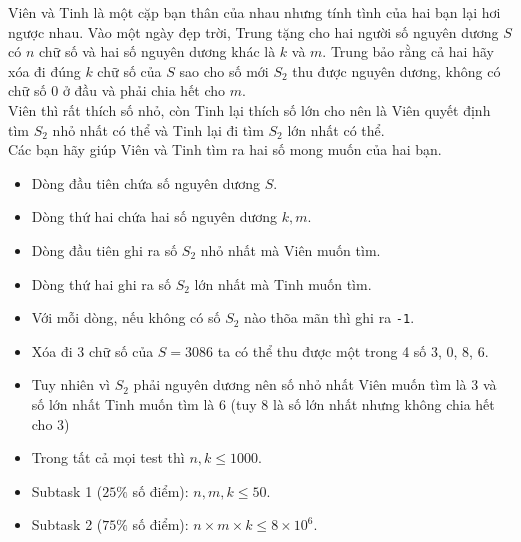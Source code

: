 \documentclass[12pt,a4paper,oneside]{article}
\begin{document}

\renewcommand{\baselinestretch}{1.25}
\setlength{\parskip}{1em}

\renewcommand{\baselinestretch}{1.0}
\setlength{\parskip}{0.25em}

Viên và Tinh là một cặp bạn thân của nhau nhưng tính tình của hai bạn lại hơi ngược nhau. Vào một ngày đẹp trời, Trung tặng cho hai người số nguyên dương $S$ có $n$ chữ số và hai số nguyên dương khác là $k$ và $m$. Trung bảo rằng cả hai hãy xóa đi đúng $k$ chữ số của $S$ sao cho số mới $S_2$ thu được nguyên dương, không có chữ số $0$ ở đầu và phải chia hết cho $m$. \\
Viên thì rất thích số nhỏ, còn Tinh lại thích số lớn cho nên là Viên quyết định tìm $S_2$ nhỏ nhất có thể và Tinh lại đi tìm $S_2$ lớn nhất có thể. \\
Các bạn hãy giúp Viên và Tinh tìm ra hai số mong muốn của hai bạn. \\



\begin{itemize}
\item Dòng đầu tiên chứa số nguyên dương $S$.
\item Dòng thứ hai chứa hai số nguyên dương $k, m$.

\end{itemize}


\begin{itemize}
\item Dòng đầu tiên ghi ra số $S_2$ nhỏ nhất mà Viên muốn tìm.
\item Dòng thứ hai ghi ra số $S_2$ lớn nhất mà Tinh muốn tìm.
\item Với mỗi dòng, nếu không có số $S_2$ nào thõa mãn thì ghi ra \texttt{-1}.
\end{itemize}


\begin{example}
%
%

  
  
\end{example}


\begin{itemize}
    \item Xóa đi 3 chữ số của $S = 3086$ ta có thể thu được một trong 4 số 3, 0, 8, 6.
    \item Tuy nhiên vì $S_2$ phải nguyên dương nên số nhỏ nhất Viên muốn tìm là 3 và số lớn nhất Tinh muốn tìm là 6 (tuy 8 là số lớn nhất nhưng không chia hết cho 3)
\end{itemize}

\begin{itemize}
    \item Trong tất cả mọi test thì $n, k \leq 1000$.
    \item Subtask 1 ($25\%$ số điểm): $n, m, k \leq 50$.
    \item Subtask 2 ($75\%$ số điểm): $n \times m \times k \leq 8 \times 10^6$.
\end{itemize}
\end{document}
